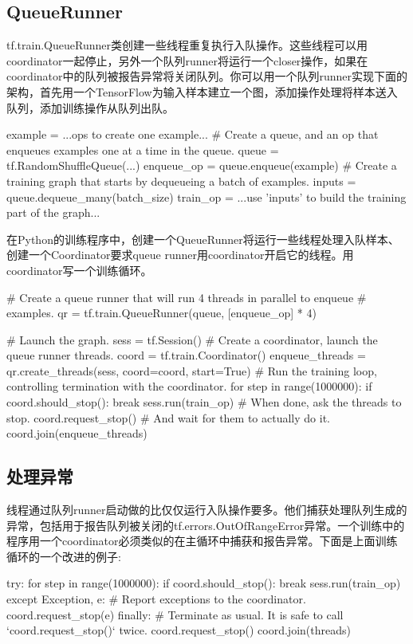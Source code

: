 \subsection{QueueRunner}
tf.train.QueueRunner类创建一些线程重复执行入队操作。这些线程可以用coordinator一起停止，另外一个队列runner将运行一个closer操作，如果在coordinator中的队列被报告异常将关闭队列。你可以用一个队列runner实现下面的架构，首先用一个TensorFlow为输入样本建立一个图，添加操作处理将样本送入队列，添加训练操作从队列出队。
\begin{python}
example = ...ops to create one example...
# Create a queue, and an op that enqueues examples one at a time in the queue.
queue = tf.RandomShuffleQueue(...)
enqueue_op = queue.enqueue(example)
# Create a training graph that starts by dequeueing a batch of examples.
inputs = queue.dequeue_many(batch_size)
train_op = ...use 'inputs' to build the training part of the graph...	
\end{python}
在Python的训练程序中，创建一个QueueRunner将运行一些线程处理入队样本、创建一个Coordinator要求queue runner用coordinator开启它的线程。用coordinator写一个训练循环。
\begin{python}
# Create a queue runner that will run 4 threads in parallel to enqueue
# examples.
qr = tf.train.QueueRunner(queue, [enqueue_op] * 4)

# Launch the graph.
sess = tf.Session()
# Create a coordinator, launch the queue runner threads.
coord = tf.train.Coordinator()
enqueue_threads = qr.create_threads(sess, coord=coord, start=True)
# Run the training loop, controlling termination with the coordinator.
for step in range(1000000):
    if coord.should_stop():
        break
    sess.run(train_op)
# When done, ask the threads to stop.
coord.request_stop()
# And wait for them to actually do it.
coord.join(enqueue_threads)
\end{python}
\subsection{处理异常}
线程通过队列runner启动做的比仅仅运行入队操作要多。他们捕获处理队列生成的异常，包括用于报告队列被关闭的tf.errors.OutOfRangeError异常。一个训练中的程序用一个coordinator必须类似的在主循环中捕获和报告异常。下面是上面训练循环的一个改进的例子:
\begin{python}
try:
    for step in range(1000000):
      if coord.should_stop():
        break
      sess.run(train_op)
except Exception, e:
    # Report exceptions to the coordinator.
    coord.request_stop(e)
finally:
    # Terminate as usual. It is safe to call `coord.request\_stop()` twice.
    coord.request_stop()
    coord.join(threads)
\end{python}
